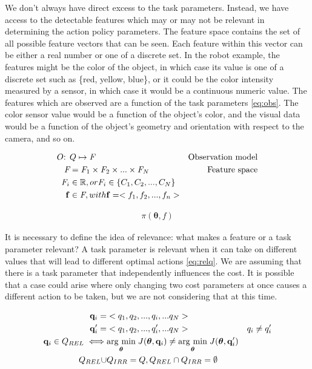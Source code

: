 \documentclass[12pt]{article}
\newcommand{\feat}   {\ensuremath{f}}
\newcommand{\featsp} {\ensuremath{\emph{F}}}
\newcommand{\taskp}  {\ensuremath{\mathbf{q}}}
\newcommand{\taskpv} {\ensuremath{q}}
\newcommand{\costf}  {\ensuremath{J}}
\newcommand{\obsm}   {\ensuremath{O}}
\newcommand{\app}    {\ensuremath{\bm{\theta}}}
\newcommand{\taskpsp}{\ensuremath{Q}}
\newcommand{\featv}  {\ensuremath{\mathbf{f}}}
\newcommand{\argmin}[1]{\underset{#1}{\operatorname{arg}\,\operatorname{min}}\;}
\begin{document}
We don't always have direct excess to the task parameters. Instead, we have access to the detectable features which may or may not be relevant in determining the action policy parameters.  The feature space contains the set of all possible feature vectors that can be seen. Each feature within this vector can be either a real number or one of a discrete set. In the robot example, the features might be the color of the object, in which case its value is one of a discrete set such as \{red, yellow, blue\}, or it could be the color intensity measured by a sensor, in which case it would be a continuous numeric value. The features which are observed are a function of the task parameters \eqref{eq:obs}. The color sensor value would be a function of the object's color, and the visual data would be a function of the object's geometry and orientation with respect to the camera, and so on.

\begin{align}
\obsm\mbox{: } &\label{eq:obs}\taskpsp \mapsto \featsp& \mbox{Observation model}\\
\featsp &= \featsp_1 \times \featsp_2 \times ... \times \featsp_N & \mbox{Feature space}\\
\featsp_i &\in \mathbb{R}, or \featsp_i \in \{C_1,C_2,...,C_N\}&\notag\\
\featv &\in \featsp, with \featv = <\feat_1,\feat_2,...,\feat_n>&
\end{align}

\begin{align}
\label{eq:fgating}\pi(\app,\feat)
\end{align}

It is necessary to define the idea of relevance: what makes a feature or a task parameter relevant? A task parameter is relevant when it can take on different values that will lead to different optimal actions \eqref{eq:relq}. We are assuming that there is a task parameter that independently influences the cost. It is possible that a case could arise where only changing two cost parameters at once causes a different action to be taken, but we are not considering that at this time. 

\begin{align}
\taskp_i =& <\taskpv_1,\taskpv_2,...,\taskpv_i,...\taskpv_N> \notag & 
\\
\taskp'_i =& <\taskpv_1,\taskpv_2,...,\taskpv'_i,...\taskpv_N> \notag & \taskpv_i \neq \taskpv'_i \\
\label{eq:relq} \taskp_i \in \taskpsp_{REL} \iff&\argmin{\app}\costf(\app,\taskp_i) \neq \argmin{\app}\costf(\app,\taskp'_i)\\
\taskpsp_{REL} \cup & \taskpsp_{IRR} = \taskpsp,   \taskpsp_{REL} \cap \taskpsp_{IRR} = \emptyset 
\end{align}
\end{document}
